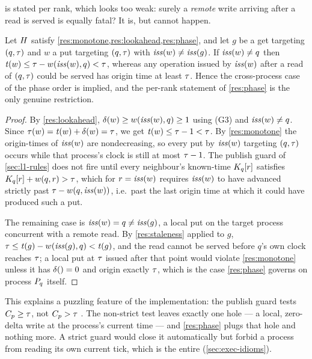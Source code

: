  is stated per rank, which looks too weak: surely a
\emph{remote} write arriving after a read is served is equally fatal? It is,
but cannot happen.

\begin{proposition}
\label{prop:phase-minimality}
Let $H$ satisfy \cref{res:monotone,res:lookahead,res:phase}, and let
$g$ be a get targeting $(q,\tau)$ and $w$ a put targeting $(q,\tau)$ with
$\mathit{iss}(w) \ne \mathit{iss}(g)$. If $\mathit{iss}(w) \ne q$ then
$\mathit{t}(w) \le \tau - w(\mathit{iss}(w),q) < \tau$, whereas any operation
issued by $\mathit{iss}(w)$ after a read of $(q,\tau)$ could be served has origin
time at least $\tau$. Hence the cross-process case of the phase order is implied,
and the per-rank statement of \cref{res:phase} is the only genuine
restriction.
\end{proposition}

\begin{proof}
By \cref{res:lookahead}, $\delta(w) \ge w(\mathit{iss}(w),q) \ge 1$ using
(G3) and $\mathit{iss}(w) \ne q$. Since $\tau(w) = \mathit{t}(w) + \delta(w) =
\tau$, we get $\mathit{t}(w) \le \tau - 1 < \tau$. By \cref{res:monotone} the
\glspl{origin-time} of $\mathit{iss}(w)$ are nondecreasing, so every put by $\mathit{iss}(w)$
targeting $(q,\tau)$ occurs while that process's clock is still at most
$\tau - 1$. The publish guard of \cref{sec:l1-rules} does not fire until every
neighbour's \gls{known-time} $K_{q}[r]$ satisfies $K_{q}[r] + w(q,r) > \tau$,
which for $r = \mathit{iss}(w)$ requires $\mathit{iss}(w)$ to have advanced strictly past
$\tau - w(q,\mathit{iss}(w))$, i.e.\ past the last origin time at which it
could have produced such a put.

The remaining case is $\mathit{iss}(w) = q \ne \mathit{iss}(g)$, a local put on the target
process concurrent with a remote read. By \cref{res:staleness} applied to $g$,
$\tau \le \mathit{t}(g) - w(\mathit{iss}(g),q) < \mathit{t}(g)$, and the read cannot
be served before $q$'s own clock reaches $\tau$; a local put at $\tau$ issued
after that point would violate \cref{res:monotone} unless it has
$\delta() = 0$ and origin exactly $\tau$, which is the case
\cref{res:phase} governs on process $P_{q}$ itself.
\end{proof}

This explains a puzzling feature of the implementation: the publish guard
tests $C_{p} \ge \tau$, not $C_{p} > \tau$
. The non-strict test leaves exactly one hole
--- a local, zero-\gls{delta} write at the process's current time --- and
\cref{res:phase} plugs that hole and nothing more. A strict guard would close
it automatically but forbid a process from reading its own current tick, which
is the entire  (\cref{sec:exec-idioms}).

